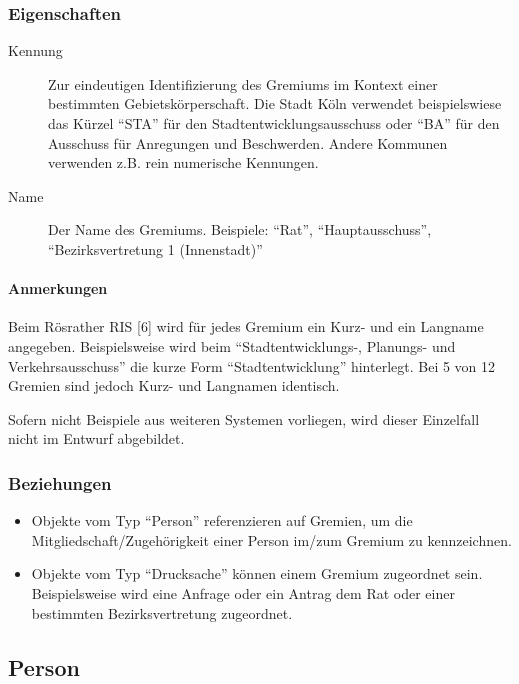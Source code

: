\subsubsection{Eigenschaften}

\begin{description}
\item[Kennung]
Zur eindeutigen Identifizierung des Gremiums im Kontext einer bestimmten
Gebietskörperschaft. Die Stadt Köln verwendet beispielswiese das Kürzel
``STA'' für den Stadtentwicklungsausschuss oder ``BA'' für den Ausschuss
für Anregungen und Beschwerden. Andere Kommunen verwenden z.B. rein
numerische Kennungen.
\item[Name]
Der Name des Gremiums. Beispiele: ``Rat'', ``Hauptausschuss'',
``Bezirksvertretung 1 (Innenstadt)''
\end{description}

\paragraph{Anmerkungen}

Beim Rösrather RIS {[}6{]} wird für jedes Gremium ein Kurz- und ein
Langname angegeben. Beispielsweise wird beim ``Stadtentwicklungs-,
Planungs- und Verkehrsausschuss'' die kurze Form ``Stadtentwicklung''
hinterlegt. Bei 5 von 12 Gremien sind jedoch Kurz- und Langnamen
identisch.

Sofern nicht Beispiele aus weiteren Systemen vorliegen, wird dieser
Einzelfall nicht im Entwurf abgebildet.

\subsubsection{Beziehungen}

\begin{itemize}
\item
  Objekte vom Typ ``Person'' referenzieren auf Gremien, um die
  Mitgliedschaft/Zugehörigkeit einer Person im/zum Gremium zu
  kennzeichnen.
\item
  Objekte vom Typ ``Drucksache'' können einem Gremium zugeordnet sein.
  Beispielsweise wird eine Anfrage oder ein Antrag dem Rat oder einer
  bestimmten Bezirksvertretung zugeordnet.
\end{itemize}

\subsection{Person}

